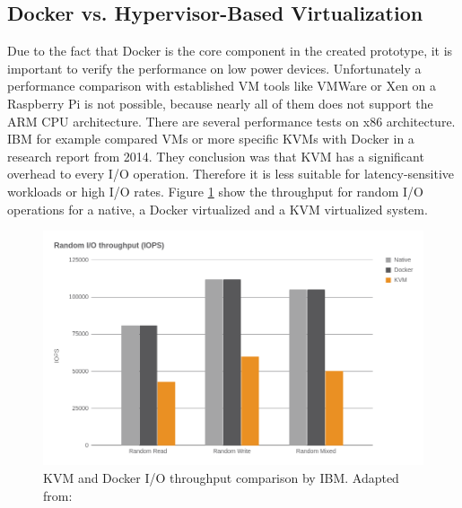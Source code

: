 \subsection{Docker vs. Hypervisor-Based Virtualization}
Due to the fact that Docker is the core component in the created prototype, it is important to verify the performance on low power devices.
Unfortunately a performance comparison with established \ac{VM} tools like VMWare or Xen on a Raspberry Pi is not possible, because nearly all of them does not support the ARM \ac{CPU} architecture.
There are several performance tests on x86 architecture.
IBM for example compared \acp{VM} or more specific \acp{KVM} with Docker in a research report\autocite{IBM:Performance:2014} from 2014.
They conclusion was that \ac{KVM} has a significant overhead to every I/O operation.
Therefore it is less suitable for latency-sensitive workloads or high I/O rates.
Figure \ref{fig:ibm_kvm_docker_io} show the throughput for random I/O operations for a native, a Docker virtualized and a \ac{KVM} virtualized system.

\begin{figure}[H]
    \centering
    \includegraphics[width=\textwidth]{resources/images/performance_ibm_kvm_docker_io.png}
    \caption[KVM and Docker I/O throughput comparison by IBM]{KVM and Docker I/O throughput comparison by IBM. Adapted from: \autocite[p. 6]{IBM:Performance:2014}}
    \label{fig:ibm_kvm_docker_io}
\end{figure}

